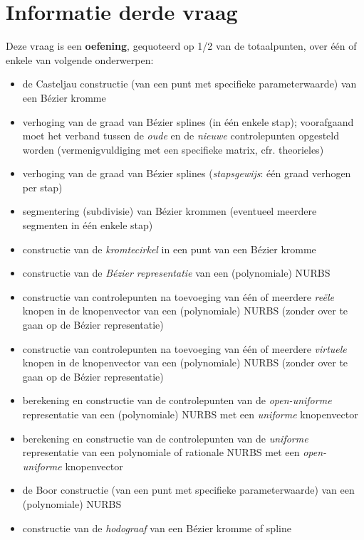 \documentclass{report}
\begin{document}
	\chapter{Informatie derde vraag}
	Deze vraag is een \textbf{oefening}, gequoteerd op 1/2 van de totaalpunten, over één of enkele van volgende onderwerpen:
	\begin{itemize}
		\item {} de Casteljau constructie (van een punt met specifieke parameterwaarde) van een Bézier kromme
		\item {} verhoging van de graad van Bézier splines (in één enkele stap); voorafgaand moet het verband tussen de \textit{oude} en de \textit{nieuwe} controlepunten opgesteld worden (vermenigvuldiging met een specifieke matrix, cfr. theorieles)
		\item {} verhoging van de graad van Bézier splines (\textit{stapsgewijs}: één graad verhogen per stap)
		\item {} segmentering (subdivisie) van Bézier krommen (eventueel meerdere segmenten in één enkele stap)
		\item {} constructie van de \textit{kromtecirkel} in een punt van een Bézier kromme
		\item {} constructie van de \textit{Bézier representatie} van een (polynomiale) NURBS
		\item {} constructie van controlepunten na toevoeging van één of meerdere \textit{reële} knopen in de knopenvector van een (polynomiale) NURBS (zonder over te gaan op de Bézier representatie)
		\item {} constructie van controlepunten na toevoeging van één of meerdere \textit{virtuele} knopen in de knopenvector van een (polynomiale) NURBS (zonder over te gaan op de Bézier representatie)
		\item {} berekening en constructie van de controlepunten van de \textit{open-uniforme} representatie van een (polynomiale) NURBS met een \textit{uniforme} knopenvector
		\item {} berekening en constructie van de controlepunten van de \textit{uniforme} representatie van een polynomiale of rationale NURBS met een \textit{open-uniforme} knopenvector
		\item {} de Boor constructie (van een punt met specifieke parameterwaarde) van een (polynomiale) NURBS
		\item {} constructie van de \textit{hodograaf} van een Bézier kromme of spline

\end{itemize}
\end{document}
